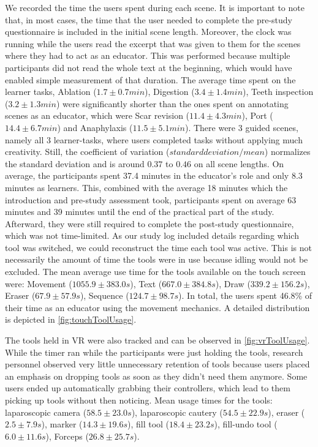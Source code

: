 We recorded the time the users spent during each scene. It is important to note that, in most cases, the time that the user needed to complete the pre-study questionnaire is included in the initial scene length. Moreover, the clock was running while the users read the excerpt that was given to them for the scenes where they had to act as an educator. This was performed because multiple participants did not read the whole text at the beginning, which would have enabled simple measurement of that duration. The average time spent on the learner tasks, Ablation ($1.7\pm{}0.7 min$), Digestion ($3.4\pm{}1.4 min$), Teeth inspection ($3.2\pm{}1.3 min$) were significantly shorter than the ones spent on annotating scenes as an educator, which were Scar revision ($11.4\pm{}4.3 min$), Port ($14.4\pm{}6.7 min$) and Anaphylaxis ($11.5\pm{}5.1 min$). There were 3 guided scenes, namely all 3 learner-tasks, where users completed tasks without applying much creativity. Still, the coefficient of variation ($standard deviation / mean$) normalizes the standard deviation and is around $0.37$ to $0.46$ on all scene lengths.
%
On average, the participants spent 37.4 minutes in the educator's role and only 8.3 minutes as learners. This, combined with the average 18 minutes which the introduction and pre-study assessment took, participants spent on average 63 minutes and 39 minutes until the end of the practical part of the study. Afterward, they were still required to complete the post-study questionnaire, which was not time-limited.
%
As our study log included details regarding which tool was switched, we could reconstruct the time each tool was active. This is not necessarily the amount of time the tools were in use because idling would not be excluded. The mean average use time for the tools available on the touch screen were: Movement ($1055.9\pm{}383.0s$), Text ($667.0\pm{}384.8s$), Draw ($339.2\pm{}156.2s$), Eraser ($67.9\pm{}57.9s$), Sequence ($124.7\pm{}98.7s$). In total, the users spent 46.8\% of their time as an educator using the movement mechanics. A detailed distribution is depicted in \autoref{fig:touchToolUsage}.


The tools held in VR were also tracked and can be observed in \autoref{fig:vrToolUsage}. While the timer ran while the participants were just holding the tools, research personnel observed very little unnecessary retention of tools because users placed an emphasis on dropping tools as soon as they didn't need them anymore. Some users ended up automatically grabbing their controllers, which lead to them picking up tools without then noticing. Mean usage times for the tools: laparoscopic camera ($58.5\pm{}23.0s$), laparoscopic cautery ($54.5\pm{}22.9s$),  eraser ($2.5\pm{}7.9s$), marker ($14.3\pm{}19.6s$), fill tool ($18.4\pm{}23.2s$), fill-undo tool ($6.0\pm{}11.6s$), Forceps ($26.8\pm{}25.7s$).


